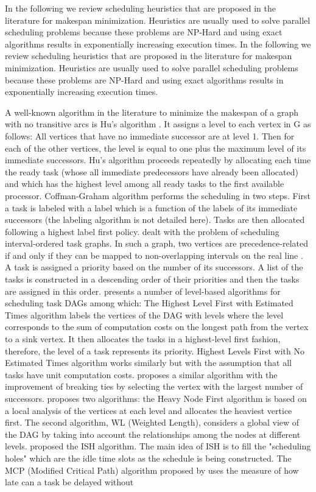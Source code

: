 In the following we review scheduling heuristics that are proposed in the literature for makespan minimization. Heuristics are usually used to solve parallel scheduling problems because these problems are NP-Hard and using exact algorithms results in exponentially increasing execution times.  
In the following we review scheduling heuristics that are proposed in the literature for makespan minimization. Heuristics are usually used to solve parallel scheduling problems because these problems are NP-Hard and using exact algorithms results in exponentially increasing execution times.  

A well-known algorithm in the literature to minimize the makespan of a graph with no transitive arcs is Hu's algorithm \cite{hu:1961}. It assigns a level to each vertex in G as follows: All vertices that have no immediate successor are at level 1. Then for each of the other vertices, the level is equal to one plus the maximum level of its immediate successors. Hu's algorithm proceeds repeatedly by allocating each time the ready task (whose all immediate predecessors have already been allocated) and which has the highest level among all ready tasks to the first available processor. Coffman-Graham algorithm \cite{coffman:1972} performs the scheduling in two steps. First a task is labeled with a label which is a function of the labels of its immediate successors (the labeling algorithm is not detailed here). Tasks are then allocated following a highest label first policy. \cite{papadimitriou:1979} dealt with the problem of scheduling interval-ordered task graphs. In such a graph, two vertices are precedence-related if and only if they can be mapped to non-overlapping intervals on the real line \cite{fishburn:1985}. A task is assigned a priority based on the number of its successors. A list of the tasks is constructed in a descending order of their priorities and then the tasks are assigned in this order. \cite{adam:1974} presents a number of level-based algorithms for scheduling task DAGs among which: The Highest Level First with Estimated Times algorithm labels the vertices of the DAG with levels where the level corresponds to the sum of computation costs on the longest path from the vertex to a sink vertex. It then allocates the tasks in a highest-level first fashion, therefore, the level of a task represents its priority. Highest Levels First with No Estimated Times algorithm works similarly but with the assumption that all tasks have unit computation costs. \cite{kasahara:1984} proposes a similar algorithm with the improvement of breaking ties by selecting the vertex with the largest number of successors. \cite{shirazi:1990} proposes two algorithms: the Heavy Node First algorithm is based on a local analysis of the vertices at each level and allocates the heaviest vertice first. The second algorithm, WL (Weighted Length), considers a global view of the DAG by taking into account the relationships among the nodes at different levels. \cite{kruatrachue:1987} proposed the ISH algorithm. The main idea of ISH is to fill the "scheduling holes"  which are the idle time slots as the schedule is being constructed. The MCP (Modified Critical Path) algorithm proposed by \cite{wu:1990} uses the measure of how late can a task be delayed without 